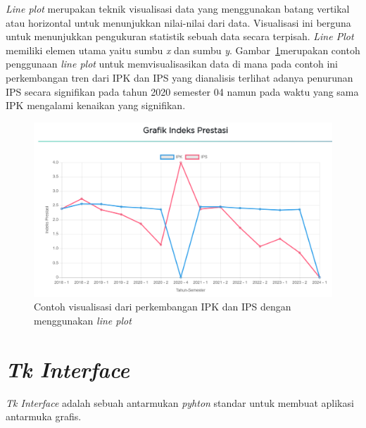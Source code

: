 \textit{Line plot} merupakan teknik visualisasi data yang menggunakan batang vertikal atau horizontal untuk menunjukkan nilai-nilai dari data. Visualisasi ini berguna untuk menunjukkan pengukuran statistik sebuah data secara terpisah. \textit{Line Plot} memiliki elemen utama yaitu sumbu \textit{x} dan sumbu \textit{y}. Gambar~\ref{fig:contoh lineplot}merupakan contoh penggunaan \textit{line plot} untuk memvisualisasikan data di mana pada contoh ini perkembangan tren dari IPK dan IPS yang dianalisis terlihat adanya penurunan IPS secara signifikan pada tahun 2020 semester 04 namun pada waktu yang sama IPK mengalami kenaikan yang signifikan. 
\begin{figure}[H]
    \centering
    \includegraphics[width=0.5\linewidth]{Gambar/ContohLineChart.png}
    \caption{Contoh visualisasi dari perkembangan IPK dan IPS dengan menggunakan \textit{line plot}}
    \label{fig:contoh lineplot}
\end{figure}

\section{\textit{Tk Interface}}
\label{sec:tkinter}
\textit{Tk Interface} adalah sebuah antarmukan \textit{pyhton} standar untuk membuat aplikasi antarmuka grafis.~\cite{tkinter}
